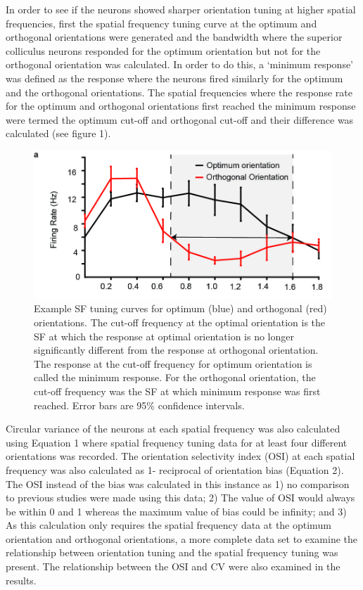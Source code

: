 In order to see if the neurons showed sharper orientation tuning at
higher spatial frequencies, first the spatial frequency tuning curve at
the optimum and orthogonal orientations were generated and the bandwidth
where the superior colliculus neurons responded for the optimum
orientation but not for the orthogonal orientation was calculated. In
order to do this, a `minimum response' was defined as the response where
the neurons fired similarly for the optimum and the orthogonal
orientations. The spatial frequencies where the response rate for the
optimum and orthogonal orientations first reached the minimum response
were termed the optimum cut-off and orthogonal cut-off and their
difference was calculated (see figure 1).
	
		\begin{figure}[H]
		
		\includegraphics[width=\linewidth]{superiorcolliculus/SCOptOrth.jpg}
		\caption{Example SF tuning curves for optimum (blue) and
			orthogonal (red) orientations. The cut-off frequency at the optimal
			orientation is the SF at which the response at optimal orientation is no
			longer significantly different from the response at orthogonal
			orientation. The response at the cut-off frequency for optimum
			orientation is called the minimum response. For the orthogonal
			orientation, the cut-off frequency was the SF at which minimum response
			was first reached. Error bars are 95\% confidence intervals.}
		\label{fig:scoptorth}
		\end{figure}
	
Circular variance of the neurons at each spatial frequency was also
calculated using Equation 1 where spatial frequency tuning data for at
least four different orientations was recorded. The orientation
selectivity index (OSI) at each spatial frequency was also calculated as
1- reciprocal of orientation bias (Equation 2). The OSI instead of the
bias was calculated in this instance as 1) no comparison to previous
studies were made using this data; 2) The value of OSI would always be
within 0 and 1 whereas the maximum value of bias could be infinity; and
3) As this calculation only requires the spatial frequency data at the
optimum orientation and orthogonal orientations, a more complete data
set to examine the relationship between orientation tuning and the
spatial frequency tuning was present. The relationship between the OSI
and CV were also examined in the results.


